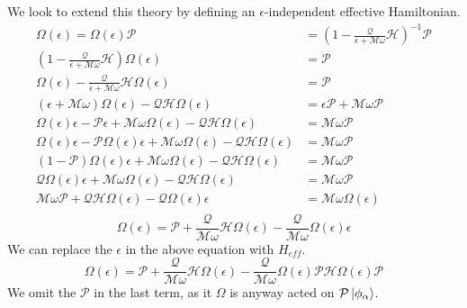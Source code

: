 We look to extend this theory by defining an $\epsilon$-independent effective Hamiltonian.
\begin{align*}
 \Omega(\epsilon) = \Omega(\epsilon)\mathcal{P} &= \left(1 - \frac{\mathcal{Q}}{\epsilon + \mathcal{M}\omega}\mathcal{H}\right)^{-1} \mathcal{P} \\
 \left(1 - \frac{\mathcal{Q}}{\epsilon + \mathcal{M}\omega}\mathcal{H}\right)\Omega(\epsilon) &= \mathcal{P} \\
 \Omega(\epsilon) - \frac{\mathcal{Q}}{\epsilon + \mathcal{M}\omega}\mathcal{H}\Omega(\epsilon) &= \mathcal{P} \\
 (\epsilon + \mathcal{M}\omega)\Omega(\epsilon) - \mathcal{Q}\mathcal{H}\Omega(\epsilon) &= \epsilon\mathcal{P} + \mathcal{M}\omega\mathcal{P} \\
 \Omega(\epsilon)\epsilon - \mathcal{P}\epsilon + \mathcal{M}\omega\Omega(\epsilon) - \mathcal{Q}\mathcal{H}\Omega(\epsilon) &= \mathcal{M}\omega\mathcal{P} \\
 \Omega(\epsilon)\epsilon - \mathcal{P}\Omega(\epsilon)\epsilon + \mathcal{M}\omega\Omega(\epsilon) - \mathcal{Q}\mathcal{H}\Omega(\epsilon) &= \mathcal{M}\omega\mathcal{P} \\
 (1-\mathcal{P})\Omega(\epsilon)\epsilon + \mathcal{M}\omega\Omega(\epsilon) - \mathcal{Q}\mathcal{H}\Omega(\epsilon) &= \mathcal{M}\omega\mathcal{P} \\
 \mathcal{Q}\Omega(\epsilon)\epsilon + \mathcal{M}\omega\Omega(\epsilon) - \mathcal{Q}\mathcal{H}\Omega(\epsilon) &= \mathcal{M}\omega\mathcal{P} \\
 \mathcal{M}\omega\mathcal{P} + \mathcal{Q}\mathcal{H}\Omega(\epsilon) - \mathcal{Q}\Omega(\epsilon)\epsilon &= \mathcal{M}\omega\Omega(\epsilon) \\ 
\end{align*}
\begin{equation}
 \Omega(\epsilon) = \mathcal{P} + \frac{\mathcal{Q}}{\mathcal{M}\omega}\mathcal{H}\Omega(\epsilon) - \frac{\mathcal{Q}}{\mathcal{M}\omega}\Omega(\epsilon)\epsilon
\end{equation} We can replace the $\epsilon$ in the above equation with $H_{eff}$.
\begin{equation*}
 \Omega(\epsilon) = \mathcal{P} + \frac{\mathcal{Q}}{\mathcal{M}\omega}\mathcal{H}\Omega(\epsilon) - \frac{\mathcal{Q}}{\mathcal{M}\omega}\Omega(\epsilon)\mathcal{P}\mathcal{H}\Omega(\epsilon)\mathcal{P}
\end{equation*} We omit the $\mathcal{P}$ in the last term, as it $\Omega$ is anyway acted on $\mathcal{P}\ket{\phi_\alpha}$.

